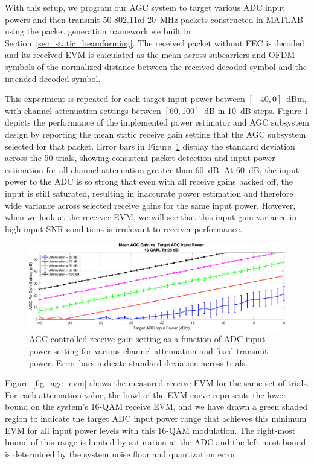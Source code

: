 	With this setup, we program our \ac{AGC} system to target various \ac{ADC} input powers and then transmit 50 802.11af 20~MHz packets constructed in MATLAB using the packet generation framework we built in Section~\ref{sec_static_beamforming}.
		The received packet without \ac{FEC} is decoded and its received \ac{EVM} is calculated as the mean across subcarriers and OFDM symbols of the normalized distance between the received decoded symbol and the intended decoded symbol.

	This experiment is repeated for each target input power between $[-40, 0]$~dBm, with channel attenuation settings between $[60, 100]$~dB in 10~dB steps.
	Figure \ref{fig_agc_rxgain} depicts the performance of the implemented power estimator and \ac{AGC} subsystem design by reporting the mean static receive gain setting that the \ac{AGC} subsystem selected for that packet.
	Error bars in Figure~\ref{fig_agc_rxgain} display the standard deviation across the 50 trials, showing consistent packet detection and input power estimation for all channel attenuation greater than 60~dB.
	At 60~dB, the input power to the \ac{ADC} is so strong that even with all receive gains backed off, the input is still saturated, resulting in inaccurate power estimation and therefore wide variance across selected receive gains for the same input power.
	However, when we look at the receiver \ac{EVM}, we will see that this input gain variance in high input \ac{SNR} conditions is irrelevant to receiver performance.


\begin{figure}[ht]
\centering
  \includegraphics[width=1\linewidth]{figs/agc/AGCTarget_v_EVM_16QAM_ALLdBAtten_Tx25_20MHz_rxgain}   
    \caption{AGC-controlled receive gain setting as a function of ADC input power setting for various channel attenuation and fixed transmit power. Error bars indicate standard deviation across trials.}
\label{fig_agc_rxgain}
\end{figure}
	
	Figure~\ref{fig_agc_evm} shows the measured receive \ac{EVM} for the same set of trials.
	For each attenuation value, the bowl of the EVM curve represents the lower bound on the system's 16-QAM receive EVM, and we have drawn a green shaded region to indicate the target \ac{ADC} input power range that achieves this minimum \ac{EVM} for all input power levels with this 16-QAM modulation.
	The right-most bound of this range is limited by saturation at the ADC and the left-most bound is determined by the system noise floor and quantization error.
	
